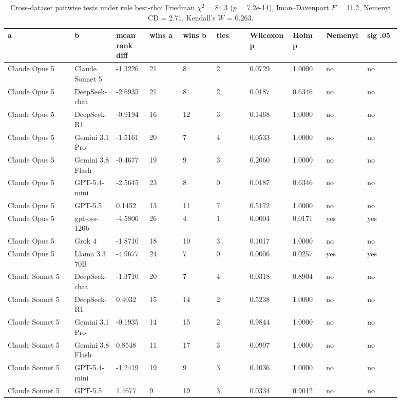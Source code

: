 \begin{landscape}
\tiny
\setlength{\tabcolsep}{3pt}
\begin{longtable}{p{0.162\linewidth}p{0.081\linewidth}p{0.081\linewidth}p{0.081\linewidth}p{0.081\linewidth}p{0.081\linewidth}p{0.081\linewidth}p{0.081\linewidth}p{0.081\linewidth}p{0.081\linewidth}}
\caption{Cross-dataset pairwise tests under rule best-rho: Friedman $\chi^2$ = 84.3 ($p$ = 7.2e-14), Iman--Davenport $F$ = 11.2, Nemenyi CD = 2.71, Kendall's $W$ = 0.263.}\label{tab:pairwise_best_anchor}\\
\toprule
a & b & mean rank diff & wins a & wins b & ties & Wilcoxon p & Holm p & Nemenyi & sig .05 \\
\midrule
Claude Opus 5 & Claude Sonnet 5 & -1.3226 & 21 & 8 & 2 & 0.0729 & 1.0000 & no & no \\
Claude Opus 5 & DeepSeek-chat & -2.6935 & 21 & 8 & 2 & 0.0187 & 0.6346 & no & no \\
Claude Opus 5 & DeepSeek-R1 & -0.9194 & 16 & 12 & 3 & 0.1468 & 1.0000 & no & no \\
Claude Opus 5 & Gemini 3.1 Pro & -1.5161 & 20 & 7 & 4 & 0.0533 & 1.0000 & no & no \\
Claude Opus 5 & Gemini 3.8 Flash & -0.4677 & 19 & 9 & 3 & 0.2060 & 1.0000 & no & no \\
Claude Opus 5 & GPT-5.4-mini & -2.5645 & 23 & 8 & 0 & 0.0187 & 0.6346 & no & no \\
Claude Opus 5 & GPT-5.5 & 0.1452 & 13 & 11 & 7 & 0.5172 & 1.0000 & no & no \\
Claude Opus 5 & gpt-oss-120b & -4.5806 & 26 & 4 & 1 & 0.0004 & 0.0171 & yes & yes \\
Claude Opus 5 & Grok 4 & -1.8710 & 18 & 10 & 3 & 0.1017 & 1.0000 & no & no \\
Claude Opus 5 & Llama 3.3 70B & -4.9677 & 24 & 7 & 0 & 0.0006 & 0.0257 & yes & yes \\
Claude Sonnet 5 & DeepSeek-chat & -1.3710 & 20 & 7 & 4 & 0.0318 & 0.8904 & no & no \\
Claude Sonnet 5 & DeepSeek-R1 & 0.4032 & 15 & 14 & 2 & 0.5238 & 1.0000 & no & no \\
Claude Sonnet 5 & Gemini 3.1 Pro & -0.1935 & 14 & 15 & 2 & 0.9844 & 1.0000 & no & no \\
Claude Sonnet 5 & Gemini 3.8 Flash & 0.8548 & 11 & 17 & 3 & 0.0997 & 1.0000 & no & no \\
Claude Sonnet 5 & GPT-5.4-mini & -1.2419 & 19 & 9 & 3 & 0.1036 & 1.0000 & no & no \\
Claude Sonnet 5 & GPT-5.5 & 1.4677 & 9 & 19 & 3 & 0.0334 & 0.9012 & no & no \\

\end{longtable}
\end{landscape}
